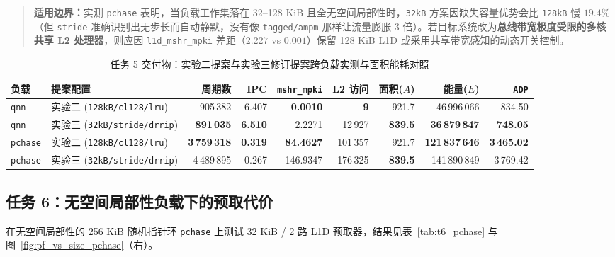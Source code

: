 \documentclass[12pt,a4paper,fontset=mac]{ctexart}
\begin{document}
\begin{enumerate}
\begin{quote}
  \textbf{适用边界：}实测 \texttt{pchase} 表明，当负载工作集落在 32--128 KiB 且全无空间局部性时，\texttt{32kB} 方案因缺失容量优势会比 \texttt{128kB} 慢 $19.4\%$（但 \texttt{stride} 准确识别出无步长而自动静默，没有像 \texttt{tagged/ampm} 那样让流量膨胀 3 倍）。若目标系统改为\textbf{总线带宽极度受限的多核共享 L2 处理器}，则应因 \texttt{l1d\_mshr\_mpki} 差距（$2.227$ vs $0.001$）保留 128 KiB L1D 或采用共享带宽感知的动态开关控制。
  \end{quote}
\end{enumerate}

\begin{table}[H]\centering\scriptsize\setlength{\tabcolsep}{3.0pt}
\caption{任务 5 交付物：实验二提案与实验三修订提案跨负载实测与面积能耗对照}\label{tab:t5_prop}
\begin{tabular}{llrrrrrrr}\toprule
负载 & 提案配置 & 周期数 & IPC & \texttt{mshr\_mpki} & L2 访问 & 面积($A$) & 能量($E$) & \texttt{ADP} \\\midrule
\texttt{qnn} & 实验二 (\texttt{128kB/cl128/lru}) & 905\,382 & 6.407 & \textbf{0.0010} & \textbf{9} & 921.7 & 46\,996\,066 & 834.50 \\
\texttt{qnn} & 实验三 (\texttt{32kB/stride/drrip}) & \textbf{891\,035} & \textbf{6.510} & 2.2271 & 12\,927 & \textbf{839.5} & \textbf{36\,879\,847} & \textbf{748.05} \\
\midrule
\texttt{pchase} & 实验二 (\texttt{128kB/cl128/lru}) & \textbf{3\,759\,318} & \textbf{0.319} & \textbf{84.4627} & 101\,357 & 921.7 & \textbf{121\,837\,646} & \textbf{3\,465.02} \\
\texttt{pchase} & 实验三 (\texttt{32kB/stride/drrip}) & 4\,489\,895 & 0.267 & 146.9347 & 176\,325 & \textbf{839.5} & 141\,890\,849 & 3\,769.42 \\
\bottomrule\end{tabular}
\end{table}

\subsection{任务 6：无空间局部性负载下的预取代价}
在无空间局部性的 256 KiB 随机指针环 \texttt{pchase} 上测试 32 KiB / 2 路 L1D 预取器，结果见表~\ref{tab:t6_pchase} 与图~\ref{fig:pf_vs_size_pchase}（右）。
\end{document}
